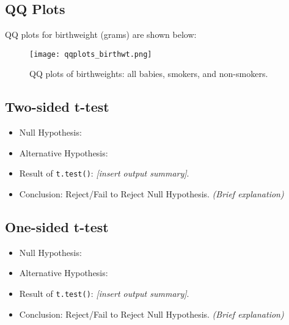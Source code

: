 \documentclass{article}
\begin{document}
\subsection{QQ Plots}
QQ plots for birthweight (grams) are shown below:

\begin{figure}[H]
    \centering
    \texttt{[image: qqplots\_birthwt.png]} %
    \caption{QQ plots of birthweights: all babies, smokers, and non-smokers.}
    \label{fig:qqplots}
\end{figure}

\subsection{Two-sided t-test}
\begin{itemize}
    \item Null Hypothesis: 
    \item Alternative Hypothesis: 
    \item Result of \texttt{t.test()}: \textit{[insert output summary]}.
    \item Conclusion: Reject/Fail to Reject Null Hypothesis. \textit{(Brief explanation)}
\end{itemize}

\subsection{One-sided t-test}
\begin{itemize}
    \item Null Hypothesis: 
    \item Alternative Hypothesis: 
    \item Result of \texttt{t.test()}: \textit{[insert output summary]}.
    \item Conclusion: Reject/Fail to Reject Null Hypothesis. \textit{(Brief explanation)}
\end{itemize}
\end{document}
